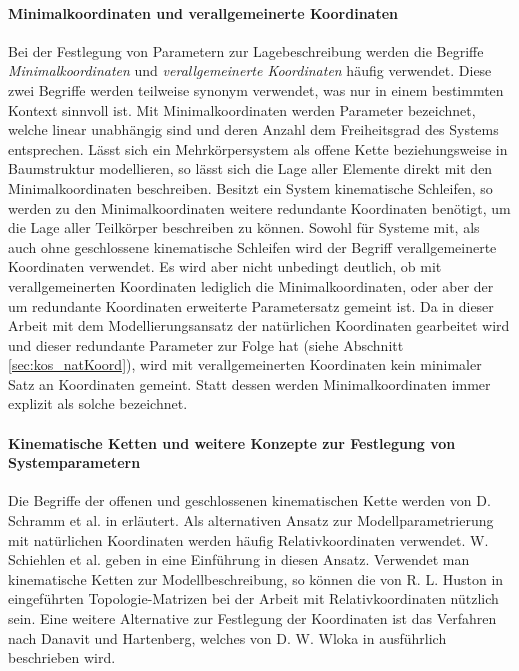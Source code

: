   \paragraph{Minimalkoordinaten und verallgemeinerte Koordinaten}
  Bei der Festlegung von Parametern zur Lagebeschreibung werden die Begriffe \textit{Minimalkoordinaten} und \textit{verallgemeinerte Koordinaten} h\"aufig verwendet. Diese zwei Begriffe werden teilweise synonym verwendet, was nur in einem bestimmten Kontext sinnvoll ist. \hfill \newline
  Mit Minimalkoordinaten werden Parameter bezeichnet, welche linear unabh\"angig sind und deren Anzahl dem Freiheitsgrad des Systems entsprechen. L\"asst sich ein Mehrk\"orpersystem als offene Kette beziehungsweise in Baumstruktur modellieren, so l\"asst sich die Lage aller Elemente direkt mit den Minimalkoordinaten beschreiben. \cite[S.27 f.]{Bestle2012} Besitzt ein System kinematische Schleifen, so werden zu den Minimalkoordinaten weitere redundante Koordinaten ben\"otigt, um die Lage aller Teilk\"orper beschreiben zu k\"onnen. \cite[S.63]{Schramm2010} Sowohl f\"ur Systeme mit, als auch ohne geschlossene kinematische Schleifen wird der Begriff verallgemeinerte Koordinaten verwendet.  Es wird aber nicht unbedingt deutlich, ob mit verallgemeinerten Koordinaten lediglich die Minimalkoordinaten, oder aber der um redundante Koordinaten erweiterte Parametersatz gemeint ist. \cite[S.133]{Woernle2011} Da in dieser Arbeit mit dem Modellierungsansatz der nat\"urlichen Koordinaten gearbeitet wird und dieser redundante Parameter zur Folge hat (siehe Abschnitt \ref{sec:kos_natKoord}), wird mit verallgemeinerten Koordinaten kein minimaler Satz an Koordinaten gemeint. Statt dessen werden Minimalkoordinaten immer explizit als solche bezeichnet. \hfill \newline
  \paragraph*{Kinematische Ketten und weitere Konzepte zur Festlegung von Systemparametern}
  Die Begriffe der offenen und geschlossenen kinematischen Kette werden von D. Schramm et al. in \cite[S. 52 ff.]{Schramm2010} erl\"autert. \hfill \newline
  Als alternativen Ansatz zur Modellparametrierung mit nat\"urlichen Koordinaten werden h\"aufig Relativkoordinaten verwendet. W. Schiehlen et al. geben in \cite{Schiehlen2014} eine Einf\"uhrung in diesen Ansatz. Verwendet man kinematische Ketten zur Modellbeschreibung, so k\"onnen die von R. L. Huston in \cite{Huston1986} eingef\"uhrten Topologie-Matrizen bei der Arbeit mit Relativkoordinaten n\"utzlich sein. Eine weitere Alternative zur Festlegung der Koordinaten ist das Verfahren nach Danavit und Hartenberg, welches von D. W. Wloka in \cite[S. 111 ff.]{Wloka1992} ausf\"uhrlich beschrieben wird.